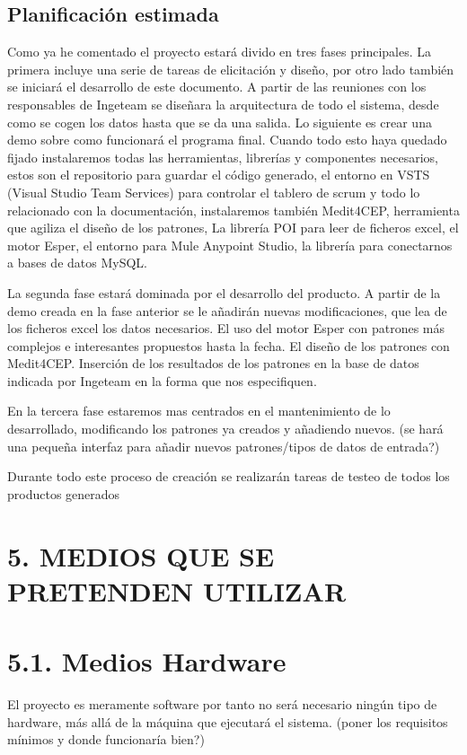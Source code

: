 \documentclass[a4paper]{article}
\begin{document}
\subsection{Planificación estimada}

Como ya he comentado el proyecto estará divido en tres fases principales. La primera incluye una serie de tareas de elicitación y diseño, por otro lado también se iniciará el desarrollo de este documento. A partir de las reuniones con los responsables de Ingeteam se diseñara la arquitectura de todo el sistema, desde como se cogen los datos hasta que se da una salida. Lo siguiente es crear una demo sobre como funcionará el programa final. Cuando todo esto haya quedado fijado instalaremos todas las herramientas, librerías y componentes necesarios, estos son el repositorio para guardar el código generado, el entorno en VSTS (Visual Studio Team Services) para controlar el tablero de scrum y todo lo relacionado con la documentación, instalaremos también Medit4CEP, herramienta que agiliza el diseño de los patrones, La librería POI para leer de ficheros excel, el motor Esper, el entorno para Mule Anypoint Studio, la librería para conectarnos a bases de datos MySQL.

La segunda fase estará dominada por el desarrollo del producto. A partir de la demo creada en la fase anterior se le añadirán nuevas modificaciones, que lea de los ficheros excel los datos necesarios. El uso del motor Esper con patrones más complejos e interesantes propuestos hasta la fecha. El diseño de los patrones con Medit4CEP. Inserción de los resultados de los patrones en la base de datos indicada por Ingeteam en la forma que nos especifiquen.

En la tercera fase estaremos mas centrados en el mantenimiento de lo desarrollado, modificando los patrones ya creados y añadiendo nuevos. (se hará una pequeña interfaz para añadir nuevos patrones/tipos de datos de entrada?)

Durante todo este proceso de creación se realizarán tareas de testeo de todos los productos generados

\section{5. MEDIOS QUE SE PRETENDEN UTILIZAR}
\section{5.1. Medios Hardware}

El proyecto es meramente software por tanto no será necesario ningún tipo de hardware, más allá de la máquina que ejecutará el sistema. (poner los requisitos mínimos y donde funcionaría bien?)
\end{document}
